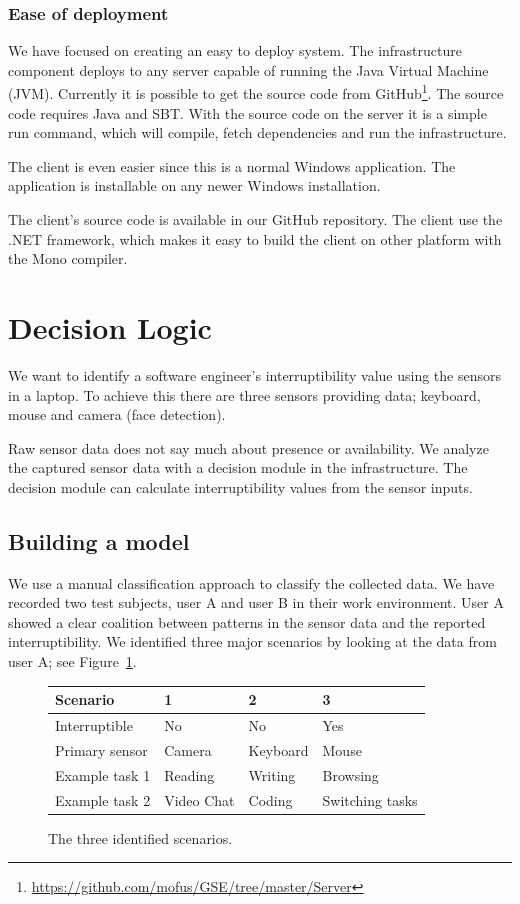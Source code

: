 \documentclass{sigchi}
\begin{document}
\subsubsection{Ease of deployment}
We have focused on creating an easy to deploy system.
The infrastructure component deploys to any server capable of running the Java Virtual Machine (JVM).
Currently it is possible to get the source code from GitHub\footnote{\url{https://github.com/mofus/GSE/tree/master/Server}}.
The source code requires Java and SBT.
With the source code on the server it is a simple run command, which will compile, fetch dependencies and run the infrastructure.

The client is even easier since this is a normal Windows application.
The application is installable on any newer Windows installation.

The client's source code is available in our GitHub repository.
The client use the .NET framework, which makes it easy to build the client on other platform with the Mono compiler.


\section{Decision Logic}
\label{sec:decision_logic}
We want to identify a software engineer's interruptibility value using the sensors in a laptop.
To achieve this there are three sensors providing data; keyboard, mouse and camera (face detection).

Raw sensor data does not say much about presence or availability.
We analyze the captured sensor data with a decision module in the infrastructure.
The decision module can calculate interruptibility values from the sensor inputs.

\subsection{Building a model}
We use a manual classification approach to classify the collected data.
We have recorded two test subjects, user A and user B in their work environment.
User A showed a clear coalition between patterns in the sensor data and the reported interruptibility.
We identified three major scenarios by looking at the data from user A; see  Figure~\ref{fig:scenarios}.

\begin{figure}[H]
  \centering
      \begin{tabular}{@{}llll@{}}
      \toprule
      \textbf{Scenario} & \textbf{1} & \textbf{2} & \textbf{3}      \\ \midrule
      Interruptible     & No         & No         & Yes             \\
      Primary sensor    & Camera     & Keyboard   & Mouse           \\
      Example task 1    & Reading    & Writing    & Browsing        \\
      Example task 2    & Video Chat & Coding     & Switching tasks \\ \bottomrule
      \end{tabular}
  \caption{The three identified scenarios.}
  \label{fig:scenarios}
\end{figure}
\end{document}
